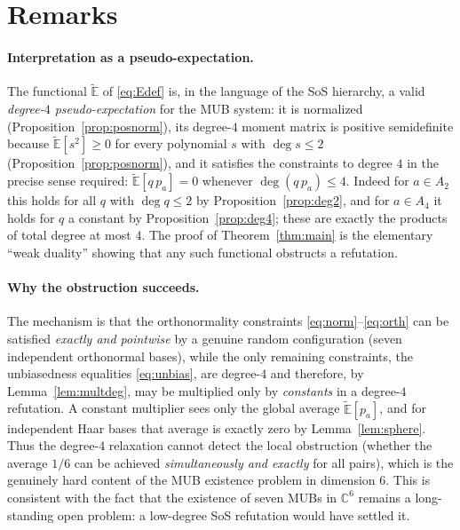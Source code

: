 \documentclass{amsart}
\theoremstyle{definition}
\theoremstyle{remark}
\begin{document}
\section{Remarks}\label{sec:remarks}

\paragraph{Interpretation as a pseudo-expectation.}
The functional $\widetilde{\mathbb{E}}$ of \eqref{eq:Edef} is, in the language of the SoS
hierarchy, a valid \emph{degree-$4$ pseudo-expectation} for the MUB system: it is normalized
(Proposition~\ref{prop:posnorm}), its degree-$4$ moment matrix is positive semidefinite
because $\widetilde{\mathbb{E}}[s^2]\ge0$ for every polynomial $s$ with $\deg s\le2$
(Proposition~\ref{prop:posnorm}), and it satisfies the constraints to degree $4$ in the precise
sense required: $\widetilde{\mathbb{E}}[q\,p_a]=0$ whenever $\deg(q\,p_a)\le4$. Indeed for
$a\in A_2$ this holds for all $q$ with $\deg q\le2$ by Proposition~\ref{prop:deg2}, and for
$a\in A_4$ it holds for $q$ a constant by Proposition~\ref{prop:deg4}; these are exactly the
products of total degree at most $4$. The proof of Theorem~\ref{thm:main} is the elementary
``weak duality'' showing that any such functional obstructs a refutation.

\paragraph{Why the obstruction succeeds.}
The mechanism is that the orthonormality constraints \eqref{eq:norm}--\eqref{eq:orth} can be
satisfied \emph{exactly and pointwise} by a genuine random configuration (seven independent
orthonormal bases), while the only remaining constraints, the unbiasedness equalities
\eqref{eq:unbias}, are degree-$4$ and therefore, by Lemma~\ref{lem:multdeg}, may be multiplied
only by \emph{constants} in a degree-$4$ refutation. A constant multiplier sees only the global
average $\widetilde{\mathbb{E}}[p_a]$, and for independent Haar bases that average is exactly
zero by Lemma~\ref{lem:sphere}. Thus the degree-$4$ relaxation cannot detect the local
obstruction (whether the average $1/6$ can be achieved \emph{simultaneously and exactly} for
all pairs), which is the genuinely hard content of the MUB existence problem in dimension $6$.
This is consistent with the fact that the existence of seven MUBs in $\mathbb{C}^6$ remains a
long-standing open problem: a low-degree SoS refutation would have settled it.
\end{document}
